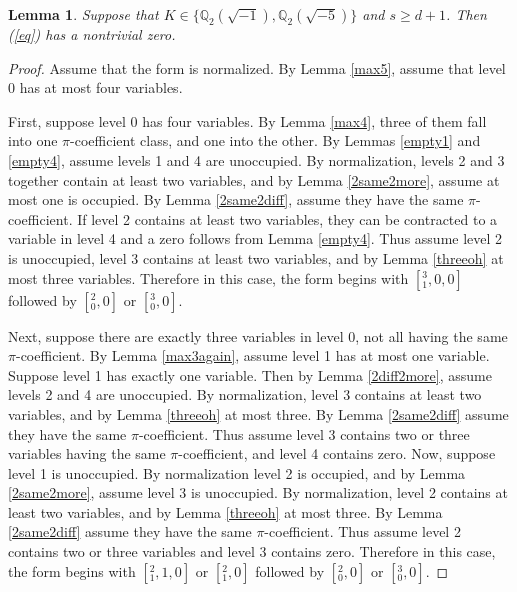 \documentclass[12pt]{amsart}
\newtheorem{lemma}{Lemma}
\begin{document}
\begin{lemma} \label{final}
Suppose that $K \in \{\mathbb{Q}_2(\sqrt{-1}), \mathbb{Q}_2(\sqrt{-5})\}$ and $s \ge d+1$.  Then (\ref{eq}) has a nontrivial zero.
\end{lemma}
\begin{proof}
Assume that the form is normalized.  By Lemma \ref{max5}, assume that level 0 has at most four variables.

First, suppose level 0 has four variables.  By Lemma \ref{max4}, three of them fall into one $\pi$-coefficient class, and one into the other.  By Lemmas \ref{empty1} and \ref{empty4}, assume levels 1 and 4 are unoccupied.  By normalization, levels 2 and 3 together contain at least two variables, and by Lemma \ref{2same2more}, assume at most one is occupied.  By Lemma \ref{2same2diff}, assume they have the same $\pi$-coefficient.  If level 2 contains at least two variables, they can be contracted to a variable in level 4 and a zero follows from Lemma \ref{empty4}.  Thus assume level 2 is unoccupied, level 3 contains at least two variables, and by Lemma \ref{threeoh} at most three variables.  Therefore in this case, the form begins with $[{}^3_1,0,0]$ followed by $[{}^2_0,0]$ or $[{}^3_0,0]$.


Next, suppose there are exactly three variables in level 0, not all having the same $\pi$-coefficient.  By Lemma \ref{max3again}, assume level 1 has at most one variable.  Suppose level 1 has exactly one variable.  Then by Lemma \ref{2diff2more}, assume levels 2 and 4 are unoccupied.  By normalization, level 3 contains at least two variables, and by Lemma \ref{threeoh} at most three.  By Lemma \ref{2same2diff} assume they have the same $\pi$-coefficient.  Thus assume level 3 contains two or three variables having the same $\pi$-coefficient, and level 4 contains zero.  Now, suppose level 1 is unoccupied.  By normalization level 2 is occupied, and by Lemma \ref{2same2more}, assume level 3 is unoccupied.  By normalization, level 2 contains at least two variables, and by Lemma \ref{threeoh} at most three.  By Lemma \ref{2same2diff} assume they have the same $\pi$-coefficient.  Thus assume level 2 contains two or three variables and level 3 contains zero.  Therefore in this case, the form begins with $[{}^2_1,1,0]$ or $[{}^2_1, 0]$ followed by $[{}^2_0,0]$ or $[{}^3_0,0]$.


\end{proof}
\end{document}
